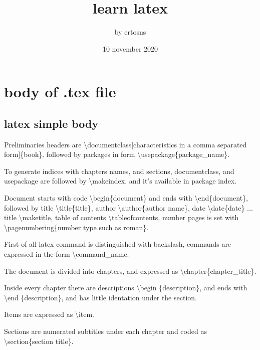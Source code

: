 \documentclass[a4paper,12pt]{book}
\begin{document}
\title{learn latex}
\author{by ertosns}
\date{10 november 2020}

\maketitle
\tableofcontents
{}

\chapter{body of .tex file}

\section{latex simple body}

\begin{description}
\item Preliminaries headers are \textbackslash documentclass[characteristics in a comma separated form]\{book\}. followed by packages in form \textbackslash usepackage\{package\_name\}.
\item To generate indices with chapters names, and sections, documentclass, and usepackage are followed by \textbackslash makeindex, and it's available in package index.
\item Document starts with code \textbackslash begin\{document\} and ends with \textbackslash end\{document\}, followed by title \textbackslash title\{title\}, author \textbackslash author\{author name\}, date \textbackslash date\{date\} ... title \textbackslash maketitle, table of contents \textbackslash tableofcontents, number pages is set with \textbackslash pagenumbering\{number type such as roman\}.
\item First of all latex command is distinguished with backslash, commands are expressed in the form \textbackslash command\_name.
\item The document is divided into chapters, and expressed as \textbackslash chapter\{chapter\_title\}.
\item Inside every chapter there are descriptions \textbackslash begin \{description\}, and ends with \textbackslash end \{description\}, and has little identation under the section.
\item Items are expressed as \textbackslash item.

\item Sections are numerated subtitles under each chapter and coded as \textbackslash section\{section title\}.
\end{description}
\end{document}
